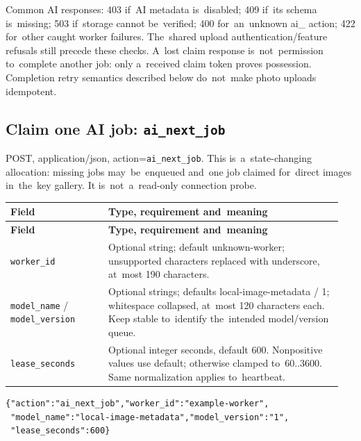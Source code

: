 \documentclass[11pt,a4paper]{article}
\newcommand{\codeword}[1]{\nolinkurl{#1}}
\begin{document}
Common AI responses: 403 if~AI metadata is~disabled; 409 if~its schema is~missing; 503
if~storage cannot be~verified; 400 for~an~unknown ai\_ action; 422 for~other caught worker
failures. The~shared upload authentication/feature refusals still precede these checks.
A~lost claim response is~not~permission to~complete another job: only a~received claim token
proves possession. Completion retry semantics described below do~not~make photo uploads
idempotent.

\subsection{\texorpdfstring{Claim one AI job: \codeword{ai_next_job}}{Claim one AI job: ai\_next\_job}}

\label{api352:ai-next-job}

POST, application/json, action=\codeword{ai_next_job}. This is~a~state-changing allocation:
missing jobs may~be~enqueued and~one job claimed for~direct images in~the~key gallery. It
is~not~a~read-only connection probe.

\begin{longtable}{@{}>{\RaggedRight\arraybackslash}p{0.28\linewidth}>{\RaggedRight\arraybackslash}p{0.67\linewidth}@{}}
\toprule
\textbf{Field} & \textbf{Type, requirement and~meaning} \\
\midrule
\endfirsthead
\toprule
\textbf{Field} & \textbf{Type, requirement and~meaning} \\
\midrule
\endhead
\bottomrule
\endfoot
\codeword{worker_id} & Optional string; default unknown-worker; unsupported characters
replaced with underscore, at~most 190 characters. \\
\codeword{model_name} / \codeword{model_version} & Optional strings; defaults
local-image-metadata / 1; whitespace collapsed, at~most 120 characters each. Keep stable
to~identify the~intended model/version queue. \\
\codeword{lease_seconds} & Optional integer seconds, default 600. Nonpositive values use
default; otherwise clamped to~60..3600. Same normalization applies to~heartbeat. \\
\end{longtable}

\begin{lstlisting}[language={}]
{"action":"ai_next_job","worker_id":"example-worker",
 "model_name":"local-image-metadata","model_version":"1",
 "lease_seconds":600}
\end{lstlisting}
\end{document}
